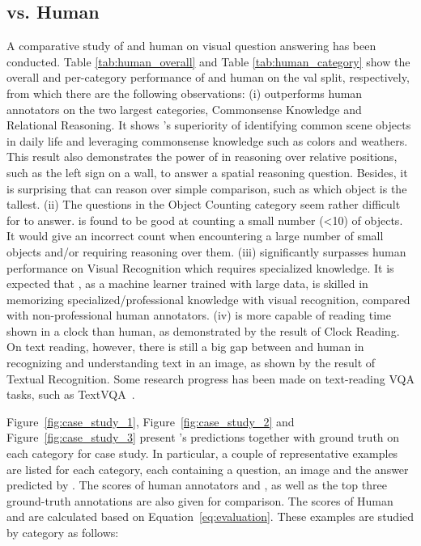 \subsection{\modelname vs. Human}




A comparative study of \modelname and human on visual question answering has been conducted. Table \ref{tab:human_overall} and Table \ref{tab:human_category} show the overall and per-category performance of \modelname and human on the val split, respectively, from which there are the following observations: 
(i) \modelname outperforms human annotators on the two largest categories, Commonsense Knowledge and Relational Reasoning. It shows \modelname's superiority of identifying common scene objects in daily life and leveraging commonsense knowledge such as colors and weathers. This result also demonstrates the power of \modelname in reasoning over relative positions, such as the left sign on a wall, to answer a spatial reasoning question. Besides, it is surprising that \modelname can reason over simple comparison, such as which object is the tallest.
(ii) The questions in the Object Counting category seem rather difficult for \modelname to answer. \modelname is found to be good at counting a small number (<10) of objects. It would give an incorrect count when encountering a large number of small objects and/or requiring reasoning over them.
(iii) \modelname significantly surpasses human performance on Visual Recognition which requires specialized knowledge. It is expected that \modelname, as a machine learner trained with large data, is skilled in memorizing specialized/professional knowledge with visual recognition, compared with non-professional human annotators.
(iv) \modelname is more capable of reading time shown in a clock than human, as demonstrated by the result of Clock Reading. On text reading, however, there is still a big gap between \modelname and human in recognizing and understanding text in an image, as shown by the result of Textual Recognition. Some research progress has been made on text-reading VQA tasks, such as TextVQA~\citep{textvqa}.





Figure~\ref{fig:case_study_1}, Figure~\ref{fig:case_study_2} and Figure~\ref{fig:case_study_3} present \modelname's predictions together with ground truth on each category for case study. In particular, a couple of representative examples are listed for each category, each containing a question, an image and the answer predicted by \modelname. The scores of human annotators and \modelname, as well as the top three ground-truth annotations are also given for comparison. The scores of Human and \modelname are calculated based on Equation~\ref{eq:evaluation}. These examples are studied by category as follows:


